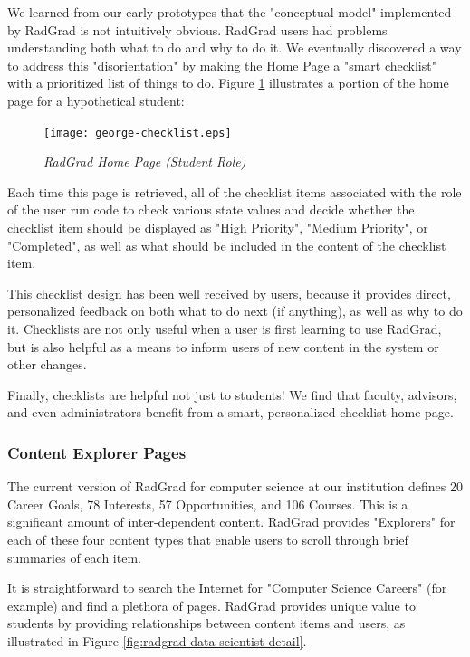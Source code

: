 \documentclass[acmsmall]{acmart}
\begin{document}
We learned from our early prototypes that the "conceptual model" implemented by RadGrad is not intuitively obvious. RadGrad users had problems understanding both what to do and why to do it.  We eventually discovered a way to address this "disorientation" by making the Home Page a "smart checklist" with a prioritized list of things to do.  Figure \ref{fig:radgrad-student-home-page} illustrates a portion of the home page for a hypothetical student:

\begin{figure}[ht]
\centering
\texttt{[image: george-checklist.eps]}
\caption{\em RadGrad Home Page (Student Role)}
\label{fig:radgrad-student-home-page}
\end{figure}

Each time this page is retrieved, all of the checklist items associated with the role of the user run code to check various state values and decide whether the checklist item should be displayed as "High Priority", "Medium Priority", or "Completed", as well as what should be included in the content of the checklist item.

This checklist design has been well received by users, because it provides direct, personalized feedback on both what to do next (if anything), as well as why to do it. Checklists are not only useful when a user is first learning to use RadGrad, but is also helpful as a means to inform users of new content in the system or other changes.

Finally, checklists are helpful not just to students!  We find that faculty, advisors, and even administrators benefit from a smart, personalized checklist home page.

\subsubsection{Content Explorer Pages}

The current version of RadGrad for computer science at our institution defines 20 Career Goals, 78 Interests, 57 Opportunities, and 106 Courses. This is a significant amount of inter-dependent content.  RadGrad provides "Explorers" for each of these four content types that enable users to scroll through brief summaries of each item.

It is straightforward to search the Internet for "Computer Science Careers" (for example) and find a plethora of pages. RadGrad provides unique value to students by providing relationships between content items and users, as illustrated in Figure \ref{fig:radgrad-data-scientist-detail}.
\end{document}
